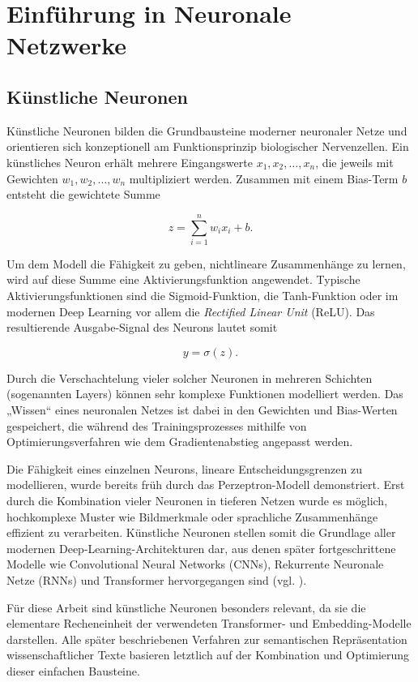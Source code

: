 \chapter{Einführung in Neuronale Netzwerke}

\section{Künstliche Neuronen}

Künstliche Neuronen bilden die Grundbausteine moderner neuronaler Netze und orientieren sich konzeptionell am Funktionsprinzip biologischer Nervenzellen. Ein künstliches Neuron erhält mehrere Eingangswerte $x_1, x_2, \dots, x_n$, die jeweils mit Gewichten $w_1, w_2, \dots, w_n$ multipliziert werden. Zusammen mit einem Bias-Term $b$ entsteht die gewichtete Summe

\[
z = \sum_{i=1}^{n} w_i x_i + b.
\]

Um dem Modell die Fähigkeit zu geben, nichtlineare Zusammenhänge zu lernen, wird auf diese Summe eine Aktivierungsfunktion angewendet. Typische Aktivierungsfunktionen sind die Sigmoid-Funktion, die Tanh-Funktion oder im modernen Deep Learning vor allem die \textit{Rectified Linear Unit} (ReLU). Das resultierende Ausgabe-Signal des Neurons lautet somit

\[
y = \sigma(z).
\]

Durch die Verschachtelung vieler solcher Neuronen in mehreren Schichten (sogenannten Layers) können sehr komplexe Funktionen modelliert werden. Das „Wissen“ eines neuronalen Netzes ist dabei in den Gewichten und Bias-Werten gespeichert, die während des Trainingsprozesses mithilfe von Optimierungsverfahren wie dem Gradientenabstieg angepasst werden.

Die Fähigkeit eines einzelnen Neurons, lineare Entscheidungsgrenzen zu modellieren, wurde bereits früh durch das Perzeptron-Modell demonstriert. Erst durch die Kombination vieler Neuronen in tieferen Netzen wurde es möglich, hochkomplexe Muster wie Bildmerkmale oder sprachliche Zusammenhänge effizient zu verarbeiten. Künstliche Neuronen stellen somit die Grundlage aller modernen Deep-Learning-Architekturen dar, aus denen später fortgeschrittene Modelle wie Convolutional Neural Networks (CNNs), Rekurrente Neuronale Netze (RNNs) und Transformer hervorgegangen sind (vgl. \cite{Goodfellow-et-al-2016}).

Für diese Arbeit sind künstliche Neuronen besonders relevant, da sie die elementare Recheneinheit der verwendeten Transformer- und Embedding-Modelle darstellen. Alle später beschriebenen Verfahren zur semantischen Repräsentation wissenschaftlicher Texte basieren letztlich auf der Kombination und Optimierung dieser einfachen Bausteine.

